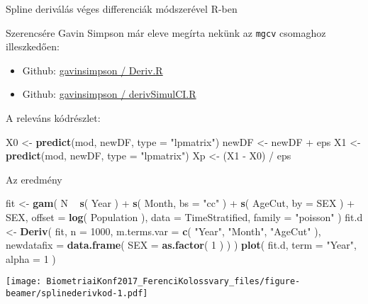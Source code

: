 \documentclass[ignorenonframetext,]{beamer}
\newenvironment{Shaded}{\begin{snugshade}}{\end{snugshade}}
\newcommand{\KeywordTok}[1]{\textcolor[rgb]{0.13,0.29,0.53}{\textbf{{#1}}}}
\newcommand{\DataTypeTok}[1]{\textcolor[rgb]{0.13,0.29,0.53}{{#1}}}
\newcommand{\DecValTok}[1]{\textcolor[rgb]{0.00,0.00,0.81}{{#1}}}
\newcommand{\StringTok}[1]{\textcolor[rgb]{0.31,0.60,0.02}{{#1}}}
\newcommand{\NormalTok}[1]{{#1}}
\providecommand{\tightlist}{%
\setlength{\itemsep}{0pt}\setlength{\parskip}{0pt}}
\begin{document}
\begin{frame}[fragile]{Spline deriválás véges differenciák módszerével
R-ben}

Szerencsére Gavin Simpson már eleve megírta nekünk az \texttt{mgcv}
csomaghoz illeszkedően:

\begin{itemize}
\tightlist
\item
  Github:
  \href{https://gist.github.com/gavinsimpson/e73f011fdaaab4bb5a30}{gavinsimpson
  / Deriv.R}
\item
  Github:
  \href{https://gist.github.com/gavinsimpson/ca18c9c789ef5237dbc6}{gavinsimpson
  / derivSimulCI.R}
\end{itemize}

A releváns kódrészlet:

\begin{Shaded}
\begin{Highlighting}[]
\NormalTok{X0 <-}\StringTok{ }\KeywordTok{predict}\NormalTok{(mod, newDF, }\DataTypeTok{type =} \StringTok{"lpmatrix"}\NormalTok{)}
\NormalTok{newDF <-}\StringTok{ }\NormalTok{newDF +}\StringTok{ }\NormalTok{eps}
\NormalTok{X1 <-}\StringTok{ }\KeywordTok{predict}\NormalTok{(mod, newDF, }\DataTypeTok{type =} \StringTok{"lpmatrix"}\NormalTok{)}
\NormalTok{Xp <-}\StringTok{ }\NormalTok{(X1 -}\StringTok{ }\NormalTok{X0) /}\StringTok{ }\NormalTok{eps}
\end{Highlighting}
\end{Shaded}

\end{frame}

\begin{frame}[fragile]{Az eredmény}

\begin{Shaded}
\begin{Highlighting}[]
\NormalTok{fit <-}\StringTok{ }\KeywordTok{gam}\NormalTok{( N ~}\StringTok{ }\KeywordTok{s}\NormalTok{( Year ) +}\StringTok{ }\KeywordTok{s}\NormalTok{( Month, }\DataTypeTok{bs =} \StringTok{"cc"} \NormalTok{) +}\StringTok{ }\KeywordTok{s}\NormalTok{( AgeCut, }\DataTypeTok{by =} \NormalTok{SEX ) +}\StringTok{ }\NormalTok{SEX,}
            \DataTypeTok{offset =} \KeywordTok{log}\NormalTok{( Population ), }\DataTypeTok{data =} \NormalTok{TimeStratified, }\DataTypeTok{family =} \StringTok{"poisson"} \NormalTok{)}
\NormalTok{fit.d <-}\StringTok{ }\KeywordTok{Deriv}\NormalTok{( fit, }\DataTypeTok{n =} \DecValTok{1000}\NormalTok{, }\DataTypeTok{m.terms.var =} \KeywordTok{c}\NormalTok{( }\StringTok{"Year"}\NormalTok{, }\StringTok{"Month"}\NormalTok{, }\StringTok{"AgeCut"} \NormalTok{),}
                \DataTypeTok{newdatafix =} \KeywordTok{data.frame}\NormalTok{( }\DataTypeTok{SEX =} \KeywordTok{as.factor}\NormalTok{( }\DecValTok{1} \NormalTok{) ) )}
\KeywordTok{plot}\NormalTok{( fit.d, }\DataTypeTok{term =} \StringTok{"Year"}\NormalTok{, }\DataTypeTok{alpha =} \DecValTok{1} \NormalTok{)}
\end{Highlighting}
\end{Shaded}

\texttt{[image: BiometriaiKonf2017\_FerenciKolossvary\_files/figure-beamer/splinederivkod-1.pdf]}

\end{frame}
\end{document}
